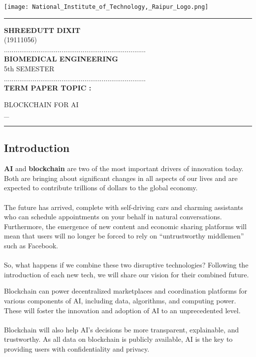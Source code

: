 \documentclass[12pt,letterpaper]{article}
\begin{document}
\begin{center}

  \texttt{[image: National\_Institute\_of\_Technology,\_Raipur\_Logo.png]}

    \hrule
    \Huge
    \textbf{SHREEDUTT DIXIT}
    \\
    \Large
    (19111056)
    \\
    ..........................................................................
    \\
    \textbf{BIOMEDICAL ENGINEERING}
    \\
    5th SEMESTER
    \\
    ..........................................................................
    \\
    \Large
    \textbf{TERM PAPER TOPIC :}

    \large
    BLOCKCHAIN FOR AI \\
    \_
    \hrule
\end{center}
\pagebreak
\large
\begin{center}
    \section* {Introduction}
\end{center}
\textbf{AI} and \textbf{blockchain} are two of the most important drivers of innovation today. Both are bringing about significant changes in all aspects of our lives and are expected to contribute trillions of dollars to the global economy. 
  \\
  \\
  The future has arrived, complete with self-driving cars and charming assistants who can schedule appointments on your behalf in natural conversations. Furthermore, the emergence of new content and economic sharing platforms will mean that users will no longer be forced to rely on “untrustworthy middlemen” such as Facebook. 
  \\
  \\
  So, what happens if we combine these two disruptive technologies? Following the introduction of each new tech, we will share our vision for their combined future.

  \pagebreak
  Blockchain can power decentralized marketplaces and coordination platforms for various components of AI, including data, algorithms, and computing power. These will foster the innovation and adoption of AI to an unprecedented level.
  \\ 
  \\
  Blockchain will also help AI’s decisions be more transparent, explainable, and trustworthy. As all data on blockchain is publicly available, AI is the key to providing users with confidentiality and privacy.
\end{document}
